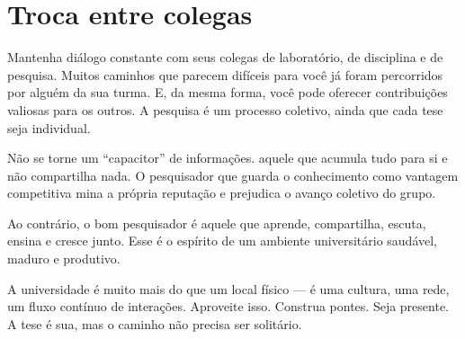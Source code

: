 \section{Troca entre colegas}

Mantenha diálogo constante com seus colegas de laboratório, de disciplina e de pesquisa. Muitos caminhos que parecem difíceis para você já foram percorridos por alguém da sua turma. E, da mesma forma, você pode oferecer contribuições valiosas para os outros. A pesquisa é um processo coletivo, ainda que cada tese seja individual.

Não se torne um ``capacitor'' de informações. aquele que acumula tudo para si e não compartilha nada. O pesquisador que guarda o conhecimento como vantagem competitiva mina a própria reputação e prejudica o avanço coletivo do grupo.

Ao contrário, o bom pesquisador é aquele que aprende, compartilha, escuta, ensina e cresce junto. Esse é o espírito de um ambiente universitário saudável, maduro e produtivo.

A universidade é muito mais do que um local físico — é uma cultura, uma rede, um fluxo contínuo de interações. Aproveite isso. Construa pontes. Seja presente. A tese é sua, mas o caminho não precisa ser solitário.
